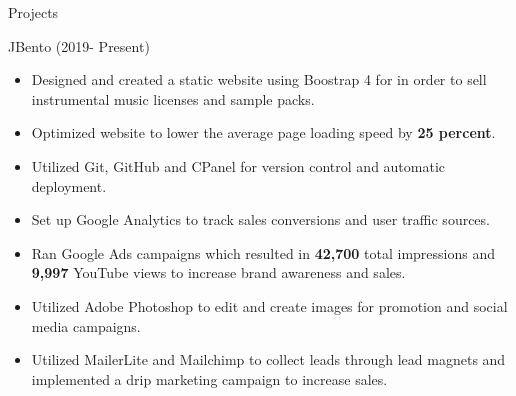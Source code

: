 \documentclass[]{johnsoncv}
\begin{document}
	\begin{cvsection}{Projects}
		\begin{cvsubsection}{JBento (2019- Present)}{}{}
			\begin{itemize}
		\item Designed and created a static website using Boostrap 4 for in order to sell instrumental music licenses and sample packs.
		\item Optimized website to lower the average page loading speed by \textbf{25 percent}.
		\item Utilized Git, GitHub and CPanel for version control and automatic deployment.
		\item Set up Google Analytics to track sales conversions and user traffic sources.
		\item Ran Google Ads campaigns which resulted in \textbf{42,700} total impressions and \textbf{9,997} YouTube views to increase brand awareness and sales.
		\item Utilized Adobe Photoshop to edit and create images for promotion and social media campaigns.
		\item Utilized MailerLite and Mailchimp to collect leads through lead magnets and implemented a drip marketing campaign to increase sales.
			\end{itemize}
	\end{cvsubsection}


\end{cvsection}
\end{document}
